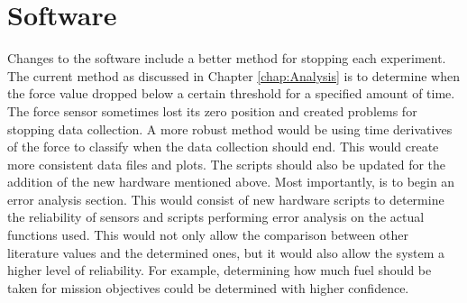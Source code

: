 \section{Software}
Changes to the software include a better method for stopping each experiment. The current method as discussed in Chapter \ref{chap:Analysis} is to determine when the force value dropped below a certain threshold for a specified amount of time. The force sensor sometimes lost its zero position and created problems for stopping data collection. A more robust method would be using time derivatives of the force to classify when the data collection should end. This would create more consistent data files and plots. The scripts should also be updated for the addition of the new hardware mentioned above. Most importantly, is to begin an error analysis section. This would consist of new hardware scripts to determine the reliability of sensors and scripts performing error analysis on the actual functions used. This would not only allow the comparison between other literature values and the determined ones, but it would also allow the system a higher level of reliability. For example, determining how much fuel should be taken for mission objectives could be determined with higher confidence.